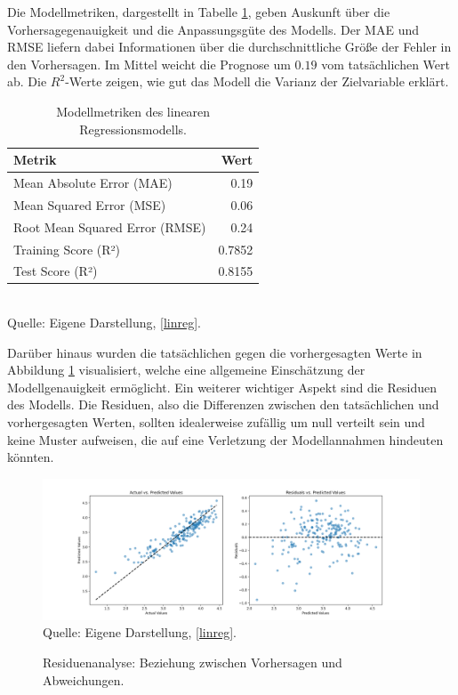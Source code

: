 Die Modellmetriken, dargestellt in Tabelle \ref{tab:model-metrics}, 
geben Auskunft über die Vorhersagegenauigkeit und die Anpassungsgüte des Modells. 
Der MAE und RMSE liefern dabei Informationen über die durchschnittliche Größe 
der Fehler in den Vorhersagen. Im Mittel weicht die Prognose um $0.19$ vom tatsächlichen Wert ab.
Die $R^2$-Werte zeigen, wie gut das Modell die Varianz der Zielvariable erklärt.

\begin{table}[!h]
    \caption{Modellmetriken des linearen Regressionsmodells.}
    \begin{tabularx}{\textwidth}{Xr}
    \toprule
    Metrik & Wert \\
    \midrule
    Mean Absolute Error (MAE) & 0.19 \\
    Mean Squared Error (MSE) & 0.06 \\
    Root Mean Squared Error (RMSE) & 0.24 \\
    Training Score (R²) & 0.7852 \\
    Test Score (R²) & 0.8155 \\
    \bottomrule
    \end{tabularx}
    \label{tab:model-metrics}
    \\ Quelle: Eigene Darstellung, \ref{linreg}.
\end{table}

Darüber hinaus wurden die tatsächlichen gegen die vorhergesagten Werte
in Abbildung \ref{pic:residuals} visualisiert, welche eine allgemeine Einschätzung der 
Modellgenauigkeit ermöglicht. Ein weiterer wichtiger Aspekt sind die Residuen des Modells. 
Die Residuen, also die Differenzen zwischen den tatsächlichen und vorhergesagten Werten, 
sollten idealerweise zufällig um null verteilt sein und keine Muster aufweisen, 
die auf eine Verletzung der Modellannahmen hindeuten könnten.

\begin{figure}[!h]
    \caption{Residuenanalyse: Beziehung zwischen Vorhersagen und Abweichungen.}
    \includegraphics[width=1\textwidth]{../scripts/images/residuals.png}
    Quelle: Eigene Darstellung, \ref{linreg}.
    \label{pic:residuals}
\end{figure}


